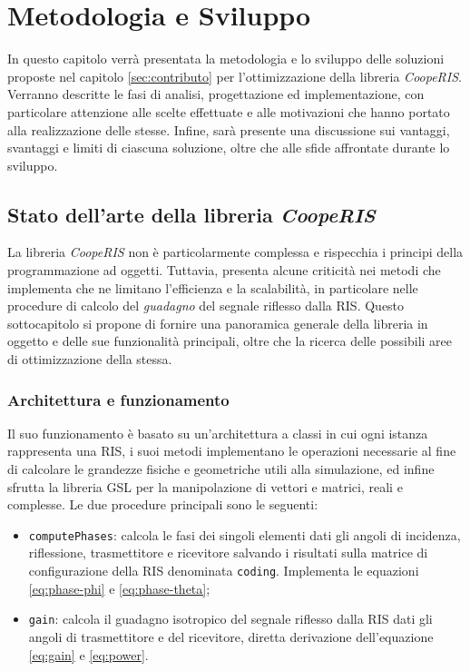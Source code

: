 \chapter{Metodologia e Sviluppo}
\label{ch:metodologiasviluppo}

In questo capitolo verrà presentata la metodologia e lo sviluppo delle soluzioni
proposte nel capitolo \ref{sec:contributo} per l'ottimizzazione della libreria
\textit{CoopeRIS}. Verranno descritte le fasi di analisi, progettazione ed implementazione,
con particolare attenzione alle scelte effettuate e alle motivazioni che hanno
portato alla realizzazione delle stesse. Infine, sarà presente una discussione
sui vantaggi, svantaggi e limiti di ciascuna soluzione, oltre che alle sfide
affrontate durante lo sviluppo.

\section{Stato dell'arte della libreria \textit{CoopeRIS}}
\label{sec:libreria}

La libreria \textit{CoopeRIS} non è particolarmente complessa e rispecchia i
principi della programmazione ad oggetti. Tuttavia, presenta alcune criticità
nei metodi che implementa che ne limitano l'efficienza e la scalabilità, in particolare
nelle procedure di calcolo del \textit{guadagno} del segnale riflesso dalla RIS.
Questo sottocapitolo si propone di fornire una panoramica generale della libreria
in oggetto e delle sue funzionalità principali, oltre che la ricerca delle
possibili aree di ottimizzazione della stessa.

\subsection{Architettura e funzionamento}
\label{sec:architettura}

Il suo funzionamento è basato su un'architettura a classi in cui ogni istanza rappresenta
una RIS, i suoi metodi implementano le operazioni necessarie al fine di
calcolare le grandezze fisiche e geometriche utili alla simulazione, ed infine sfrutta
la libreria GSL\cite{gnugsl} per la manipolazione di vettori e matrici, reali e complesse.
Le due procedure principali sono le seguenti:

\begin{itemize}
  \item \texttt{computePhases}: calcola le fasi dei singoli elementi dati gli angoli
    di incidenza, riflessione, trasmettitore e ricevitore salvando i risultati sulla
    matrice di configurazione della RIS denominata \texttt{coding}. Implementa le
    equazioni \ref{eq:phase-phi} e \ref{eq:phase-theta};

  \item \texttt{gain}: calcola il guadagno isotropico del segnale riflesso dalla
    RIS dati gli angoli di trasmettitore e del ricevitore, diretta derivazione
    dell'equazione \ref{eq:gain} e \ref{eq:power}.
\end{itemize}

